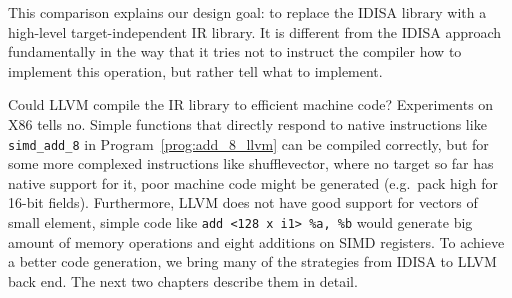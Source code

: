 This comparison explains our design goal: to replace the IDISA library with a high-level target-independent IR library. It is different from the IDISA approach fundamentally in the way that it tries not to instruct the compiler how to implement this operation, but rather tell what to implement.

Could LLVM compile the IR library to efficient machine code? Experiments on X86 tells no. Simple functions that directly respond to native instructions like {\tt simd\_add\_8} in Program~\ref{prog:add_8_llvm} can be compiled correctly, but for some more complexed instructions like shufflevector, where no target so far has native support for it, poor machine code might be generated (e.g.\ pack high for 16-bit fields). Furthermore, LLVM does not have good support for vectors of small element, simple code like \verb|add <128 x i1> %a, %b| would generate big amount of memory operations and eight additions on SIMD registers. To achieve a better code generation, we bring many of the strategies from IDISA to LLVM back end. The next two chapters describe them in detail.

